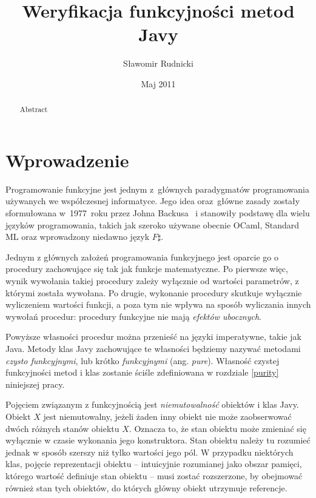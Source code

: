 \documentclass{pracamgr}
\author{Sławomir Rudnicki}
\title{Weryfikacja funkcyjności metod Javy}
\date{Maj 2011}
\begin{document}
\maketitle

\begin{abstract}
  Abstract %
\end{abstract}

\tableofcontents

\chapter*{Wprowadzenie}

Programowanie funkcyjne jest jednym z~głównych paradygmatów
programowania używanych we współczesnej informatyce. Jego idea
oraz~główne zasady zostały sformułowana w~1977~roku przez Johna
Backusa~\cite{backus} i stanowiły podstawę dla wielu języków
programowania, takich jak szeroko używane obecnie OCaml, Standard ML
oraz wprowadzony niedawno język $F\sharp$.

Jednym z głównych założeń programowania funkcyjnego jest oparcie go o
procedury zachowujące się tak jak funkcje matematyczne. Po pierwsze
więc, wynik wywołania takiej procedury zależy wyłącznie od wartości
parametrów, z którymi została wywołana. Po drugie, wykonanie procedury
skutkuje wyłącznie wyliczeniem wartości funkcji, a poza tym nie wpływa
na sposób wyliczania innych wywołań procedur: procedury funkcyjne nie mają
\emph{efektów ubocznych}.

Powyższe własności procedur można przenieść na języki imperatywne,
takie jak Java. Metody klas Javy zachowujące te własności będziemy
nazywać metodami \emph{czysto funkcyjnymi}, lub krótko
\emph{funkcyjnymi} (ang. \emph{pure}). Własność czystej
funkcyjności metod i klas zostanie ściśle zdefiniowana w rozdziale
\ref{purity} niniejszej pracy.

Pojęciem związanym z funkcyjnością jest \emph{niemutowalność} obiektów
i klas Javy.  Obiekt $X$ jest niemutowalny, jeżeli żaden inny obiekt
nie może zaobserwować dwóch różnych stanów obiektu $X$. Oznacza to, że
stan obiektu może zmieniać się wyłącznie w czasie wykonania jego
konstruktora. Stan obiektu należy tu rozumieć jednak w sposób szerszy
niż tylko wartości jego pól. W przypadku niektórych klas, pojęcie
reprezentacji obiektu -- intuicyjnie rozumianej jako obszar pamięci,
którego wartość definiuje stan obiektu -- musi zostać rozszerzone, by
obejmować również stan tych obiektów, do których główny obiekt
utrzymuje referencje.
\end{document}
